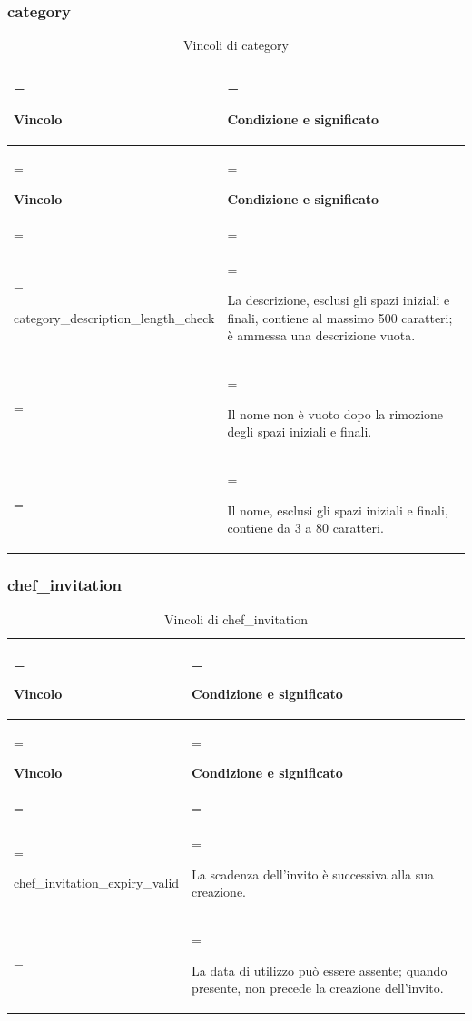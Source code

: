 \documentclass[11pt,a4paper]{article}
\begin{document}
\subsubsection{category}
{\small\renewcommand{\arraystretch}{1.25}
\begin{xltabular}{\linewidth}{>{\hsize\linewidth=\hsize\raggedright\arraybackslash}X>{\hsize\linewidth=\hsize\raggedright\arraybackslash}X}
\caption{Vincoli di category}\label{tab:dictionary-30}\\
\toprule
\textbf{Vincolo} & \textbf{Condizione e significato}\\\midrule\endfirsthead\toprule\textbf{Vincolo} & \textbf{Condizione e significato}\\\midrule\endhead
\midrule{}\\\endfoot\bottomrule\endlastfoot

{\ttfamily\small category\_\allowbreak{}description\_\allowbreak{}length\_\allowbreak{}check} & La descrizione, esclusi gli spazi iniziali e finali, contiene al massimo 500 caratteri; è ammessa una descrizione vuota.\\ & Il nome non è vuoto dopo la rimozione degli spazi iniziali e finali.\\ & Il nome, esclusi gli spazi iniziali e finali, contiene da 3 a 80 caratteri.\\*
\end{xltabular}}

\subsubsection{chef\_invitation}
{\small\renewcommand{\arraystretch}{1.25}
\begin{xltabular}{\linewidth}{>{\hsize\linewidth=\hsize\raggedright\arraybackslash}X>{\hsize\linewidth=\hsize\raggedright\arraybackslash}X}
\caption{Vincoli di chef\_invitation}\label{tab:dictionary-31}\\
\toprule
\textbf{Vincolo} & \textbf{Condizione e significato}\\\midrule\endfirsthead\toprule\textbf{Vincolo} & \textbf{Condizione e significato}\\\midrule\endhead
\midrule{}\\\endfoot\bottomrule\endlastfoot

{\ttfamily\small chef\_\allowbreak{}invitation\_\allowbreak{}expiry\_\allowbreak{}valid} & La scadenza dell'invito è successiva alla sua creazione.\\ & La data di utilizzo può essere assente; quando presente, non precede la creazione dell'invito.\\*
\end{xltabular}}
\end{document}
